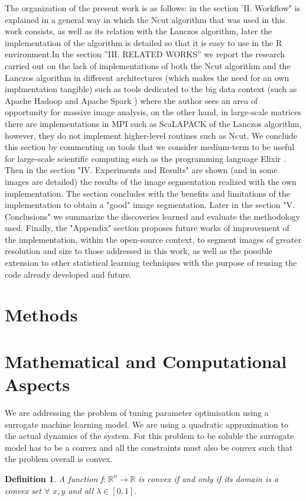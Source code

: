 \documentclass[conference]{IEEEtran}
\theoremstyle{definition}
\newtheorem{definition}{Definition}[section]
\begin{document}
The organization of the present work is as follows: in the section 'II. Workflow" is explained in a general way in which the Ncut algorithm that was used in this work consists, as well as its relation with the Lanczos algorithm, later the implementation of the algorithm is detailed so that it is easy to use in the R environment.In the section ''III. RELATED WORKS'' we report the research carried out on the lack of implementations of both the Ncut algorithm and the Lanczos algorithm in different architectures (which makes the need for an own implmentation tangible) such as tools dedicated to the big data context (such as Apache Hadoop \cite{Hadoop} and Apache Spark \cite{Spark}) where the author sees an area of opportunity for massive image analysis, on the other hand, in large-scale matrices there are implementations in MPI such as ScaLAPACK \cite{ScaLAPACK} of the Lanczos algorithm, however, they do not implement higher-level routines such as Ncut. We conclude this section by commenting on tools that we consider medium-term to be useful for large-scale scientific computing such as the programming language Elixir \cite{Elixir}. \\
Then in the section "IV. Experiments and Results" are shown (and in some images are detailed) the results of the image segmentation realized with the own implementation. The section concludes with the benefits and limitations of the implementation to obtain a "good" image segmentation. Later in the section "V. Conclusions" we summarize the discoveries learned and evaluate the methodology used. Finally, the "Appendix" section proposes future works of improvement of the implementation, within the open-source context, to segment images of greater resolution and size to those addressed in this work, as well as the possible extension to other statistical learning techniques with the purpose of reusing the code already developed and future. \\



\section{Methods}

\section{Mathematical and Computational Aspects}
We are addressing the problem of tuning parameter optimisation using a surrogate machine learning model. We are using a quadratic approximation to the actual dynamics of the system. For this problem to be soluble the surrogate model has to be a convex and all the constraints must also be convex such that the problem overall is convex. \\
\theoremstyle{definition}
\begin{definition}
\textit{A function f}: $\mathbb{R}^n \rightarrow \mathbb{R}$ \textit{is convex if and only if its domain is a convex set $\forall$ $x, y$ and all $\lambda \in [0,1]$. } 
\end{definition}
\end{document}

